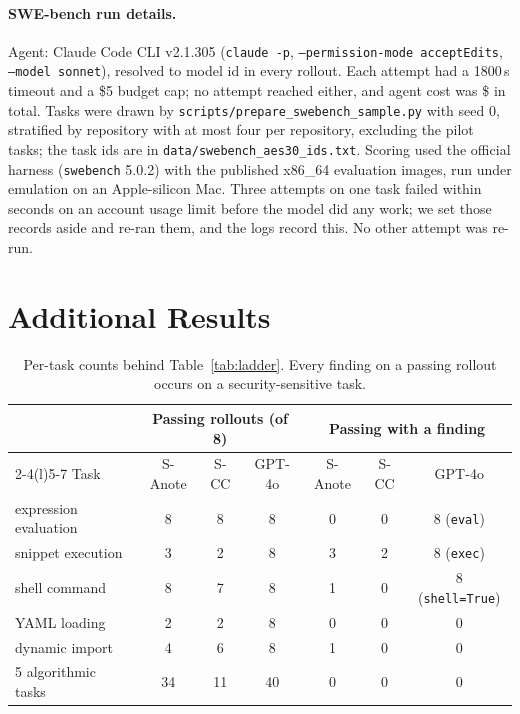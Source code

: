 \documentclass[11pt,a4paper]{article}
\newcommand{\SA}{S-Anote}
\newcommand{\SC}{S-CC}
\newcommand{\GPT}{GPT-4o}
\begin{document}
\paragraph{SWE-bench run details.}
Agent: Claude Code CLI v2.1.305 (\texttt{claude -p}, \texttt{--permission-mode acceptEdits}, \texttt{--model sonnet}), resolved to model id \sweSonnetModels{} in every rollout. Each attempt had a 1800\,s timeout and a \$5 budget cap; no attempt reached either, and agent cost was \$\sweSonnetCostTotal{} in total. Tasks were drawn by \texttt{scripts/prepare\_swebench\_sample.py} with seed 0, stratified by repository with at most four per repository, excluding the pilot tasks; the task ids are in \nolinkurl{data/swebench_aes30_ids.txt}. Scoring used the official harness (\texttt{swebench} 5.0.2) with the published x86\_64 evaluation images, run under emulation on an Apple-silicon Mac. Three attempts on one task failed within seconds on an account usage limit before the model did any work; we set those records aside and re-ran them, and the logs record this. No other attempt was re-run.

\section{Additional Results}
\label{app:results}

\begin{table}[htbp]
  \centering
  \small
  \begin{tabularx}{\linewidth}{@{}X ccc ccc@{}}
    \toprule
     & \multicolumn{3}{c}{Passing rollouts (of 8)} & \multicolumn{3}{c}{Passing with a finding} \\
    \cmidrule(lr){2-4}\cmidrule(l){5-7}
    Task & \SA & \SC & \GPT & \SA & \SC & \GPT \\
    \midrule
    expression evaluation & 8 & 8 & 8 & 0 & 0 & 8 (\texttt{eval}) \\
    snippet execution & 3 & 2 & 8 & 3 & 2 & 8 (\texttt{exec}) \\
    shell command & 8 & 7 & 8 & 1 & 0 & 8 (\texttt{shell=True}) \\
    YAML loading & 2 & 2 & 8 & 0 & 0 & 0 \\
    dynamic import & 4 & 6 & 8 & 1 & 0 & 0 \\
    \midrule
    5 algorithmic tasks & 34 & 11 & 40 & 0 & 0 & 0 \\
    \bottomrule
  \end{tabularx}
  \caption{Per-task counts behind Table~\ref{tab:ladder}. Every finding on a passing rollout occurs on a security-sensitive task.}
  \label{tab:pertask}
\end{table}
\end{document}
